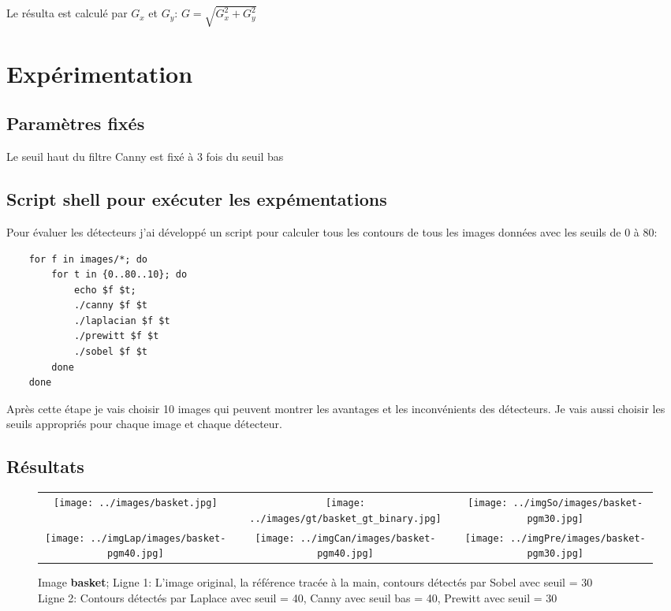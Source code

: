 \documentclass[article=a4, fontsize=11pt]{scrartcl}	%
\begin{document}
Le résulta est calculé par  $G_{x}$ et $G_{y}$:
$G = \sqrt{G_{x}^2 + G_{y}^2}$

\section{Expérimentation}
\subsection{Paramètres fixés}
	Le seuil haut du filtre Canny est fixé à 3 fois du seuil bas
\subsection{Script shell pour exécuter les expémentations}	
Pour évaluer les détecteurs j'ai développé un script pour calculer tous les contours de tous les images données avec les seuils de 0 à 80:

\begin{lstlisting}
	for f in images/*; do
	    for t in {0..80..10}; do                                                                                                                                   
	        echo $f $t; 
	        ./canny $f $t
	        ./laplacian $f $t
	        ./prewitt $f $t
	        ./sobel $f $t
	    done
	done
\end{lstlisting}

Après cette étape je vais choisir 10 images qui peuvent montrer les avantages et les inconvénients des détecteurs. Je vais aussi choisir les seuils appropriés pour chaque image et chaque détecteur.

\subsection{Résultats}
\clearpage
\begin{figure}[!ht]
	\begin{center}
		\begin{tabular}[h]{ccc}
			\texttt{[image: ../images/basket.jpg]}&
			\texttt{[image: ../images/gt/basket\_gt\_binary.jpg]}&
			\texttt{[image: ../imgSo/images/basket-pgm30.jpg]}\\
						
			\texttt{[image: ../imgLap/images/basket-pgm40.jpg]}&	
			\texttt{[image: ../imgCan/images/basket-pgm40.jpg]}&
			\texttt{[image: ../imgPre/images/basket-pgm30.jpg]}\\
		\end{tabular}
	\end{center}
	\caption{Image \textbf{basket}; Ligne 1: L'image original, la référence tracée à la main, contours détectés par Sobel avec seuil = 30\\
			 Ligne 2: Contours détectés par Laplace avec seuil = 40, Canny avec seuil bas = 40, Prewitt avec seuil = 30}	
\end{figure}
\end{document}
